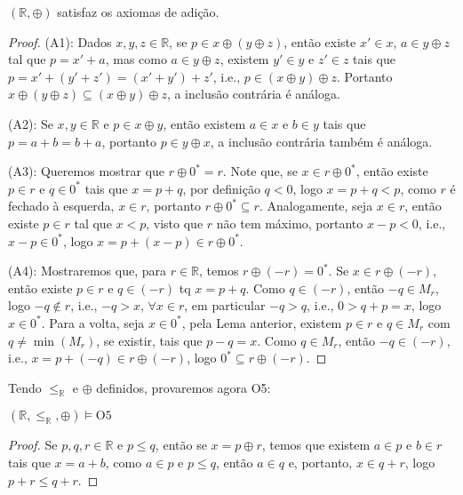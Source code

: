 \documentclass[11pt]{article}
\newcommand{\mbb}[1]{\mathbb{#1}}
\newcommand{\cl}[1]{\colorlet{shadecolor}{#1}}
\newcommand{\leqr}{\leq_\mbb{R}}
\begin{document}
\cl{orange!15}
\begin{shaded}
\begin{theorem}
    $(\mbb{R},\oplus)$ satisfaz os axiomas de adição.
\end{theorem}
\end{shaded}

\begin{proof}
    (A1): Dados $x,y,z\in\mbb{R}$, se $p\in x\oplus(y\oplus z)$, então existe $x'\in x$, $a\in y\oplus z$ tal que $p=x'+a$, mas como $a\in y\oplus z$, existem $y'\in y$ e $z'\in z$ tais que $p=x'+(y'+z')=(x'+y')+z'$, i.e., $p\in(x\oplus y)\oplus z$. Portanto $x\oplus(y\oplus z)\subseteq(x\oplus y)\oplus z$, a inclusão contrária é análoga.

    (A2): Se $x,y\in\mbb{R}$ e $p\in x\oplus y$, então existem $a\in x$ e $b\in y$ tais que $p=a+b=b+a$, portanto $p\in y\oplus x$, a inclusão contrária também é análoga.

    (A3): Queremos mostrar que $r\oplus 0^*=r$. Note que, se $x\in r\oplus0^*$, então existe $p\in r$ e $q\in0^*$ tais que $x=p+q$, por definição $q<0$, logo $x=p+q<p$, como $r$ é fechado à esquerda, $x\in r$, portanto $r\oplus0^*\subseteq r$. Analogamente, seja $x\in r$, então existe $p\in r$ tal que $x<p$, visto que $r$ não tem máximo, portanto $x-p<0$, i.e., $x-p\in0^*$, logo $x=p+(x-p)\in r\oplus0^*$.

    (A4): Mostraremos que, para $r\in\mbb{R}$, temos $r\oplus(-r)=0^*$. Se $x\in r\oplus(-r)$, então existe $p\in r$ e $q\in(-r)$ tq $x=p+q$. Como $q\in(-r)$, então $-q\in M_r$, logo $-q\notin r$, i.e., $-q> x$, $\forall x\in r$, em particular $-q> q$, i.e., $0> q + p = x$, logo $x\in 0^*$. Para a volta, seja $x\in0^*$, pela Lema anterior, existem $p\in r$ e $q\in M_r$ com $q\neq\min(M_r)$, se existir, tais que $p-q=x$. Como $q\in M_r$, então $-q\in(-r)$, i.e., $x = p + (-q) \in r\oplus(-r)$, logo $0^*\subseteq r\oplus(-r)$.
\end{proof}

Tendo $\leqr$ e $\oplus$ definidos, provaremos agora O5:

\begin{shaded}
\begin{theorem}
    $(\mbb{R},\leqr,\oplus)\vDash\text{O5}$
\end{theorem}
\end{shaded}

\begin{proof}
    Se $p,q,r\in\mbb{R}$ e $p\leq q$, então se $x=p\oplus r$, temos que existem $a\in p$ e $b\in r$ tais que $x=a+b$, como $a\in p$ e $p\leq q$, então $a\in q$ e, portanto, $x\in q+r$, logo $p+r\leq q+r$.
\end{proof}
\end{document}
